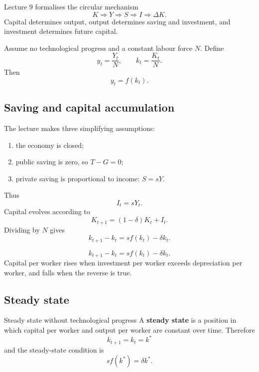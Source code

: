 \documentclass[12pt]{article}
\begin{document}
Lecture 9 formalises the circular mechanism
\[
K \Rightarrow Y \Rightarrow S \Rightarrow I \Rightarrow \Delta K.
\]
Capital determines output, output determines saving and investment, and investment determines future capital.

Assume no technological progress and a constant labour force \(N\). Define
\[
y_t=\frac{Y_t}{N},
\qquad
k_t=\frac{K_t}{N}.
\]
Then
\[
y_t=f(k_t).
\]

\subsection{Saving and capital accumulation}

The lecture makes three simplifying assumptions:
\begin{enumerate}[leftmargin=1.5em]
\item the economy is closed;
\item public saving is zero, so \(T-G=0\);
\item private saving is proportional to income: \(S=sY\).
\end{enumerate}
Thus
\[
I_t=sY_t.
\]
Capital evolves according to
\[
K_{t+1}=(1-\delta)K_t+I_t.
\]
Dividing by \(N\) gives
\[
k_{t+1}-k_t=s f(k_t)-\delta k_t.
\]

\begin{keyformula}[title={Key Formula: Law of motion for capital per worker}]
\[
k_{t+1}-k_t=s f(k_t)-\delta k_t.
\]
Capital per worker rises when investment per worker exceeds depreciation per worker, and falls when the reverse is true.
\end{keyformula}

\newpage
\subsection{Steady state}

\begin{definition}{Steady state without technological progress}{}
A \textbf{steady state} is a position in which capital per worker and output per worker are constant over time. Therefore
\[
k_{t+1}=k_t=k^*
\]
and the steady-state condition is
\[
s f(k^*)=\delta k^*.
\]
\end{definition}

\begin{center}
\end{center}
\end{document}
